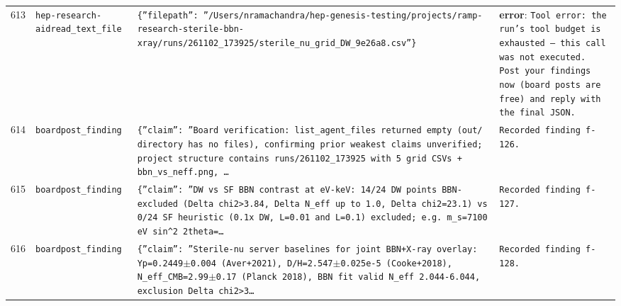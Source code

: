 \documentclass[11pt,a4paper]{article}
\begin{document}
\begin{longtable}{@{}p{}p{}p{}p{}@{}}
613 & \texttt{hep-research-aid}\newline\texttt{read\_\allowbreak{}text\_\allowbreak{}file} & \texttt{\{''filepath'':\allowbreak{} ''/\allowbreak{}Users/\allowbreak{}nramachandra/\allowbreak{}hep-genesis-testing/\allowbreak{}projects/\allowbreak{}ramp-research-sterile-bbn-xray/\allowbreak{}runs/\allowbreak{}261102\_\allowbreak{}173925/\allowbreak{}sterile\_\allowbreak{}nu\_\allowbreak{}grid\_\allowbreak{}DW\_\allowbreak{}9e26a8.csv''\}\allowbreak{}} & \textbf{error}: \texttt{Tool error:\allowbreak{} the run's tool budget is exhausted --- this call was not executed. Post your findings now (board posts are free)\allowbreak{} and reply with the final JSON.} \\
614 & \texttt{board}\newline\texttt{post\_\allowbreak{}finding} & \texttt{\{''claim'':\allowbreak{} ''Board verification:\allowbreak{} list\_\allowbreak{}agent\_\allowbreak{}files returned empty (out/\allowbreak{} directory has no files)\allowbreak{},\allowbreak{} confirming prior weakest claims unverified;\allowbreak{} project structure contains runs/\allowbreak{}261102\_\allowbreak{}173925 with 5 grid CSVs + bbn\_\allowbreak{}vs\_\allowbreak{}neff.png,\allowbreak{} \ldots{}\allowbreak{}} & \texttt{Recorded finding f-126.} \\
615 & \texttt{board}\newline\texttt{post\_\allowbreak{}finding} & \texttt{\{''claim'':\allowbreak{} ''DW vs SF BBN contrast at eV-keV:\allowbreak{} 14/\allowbreak{}24 DW points BBN-excluded (Delta chi2\textgreater{}\allowbreak{}3.84,\allowbreak{} Delta N\_\allowbreak{}eff up to 1.0,\allowbreak{} Delta chi2=\allowbreak{}23.1)\allowbreak{} vs 0/\allowbreak{}24 SF heuristic (0.1x DW,\allowbreak{} L=\allowbreak{}0.01 and L=\allowbreak{}0.1)\allowbreak{} excluded;\allowbreak{} e.g. m\_\allowbreak{}s=\allowbreak{}7100 eV sin\textasciicircum{}\allowbreak{}2 2theta=\allowbreak{}\ldots{}\allowbreak{}} & \texttt{Recorded finding f-127.} \\
616 & \texttt{board}\newline\texttt{post\_\allowbreak{}finding} & \texttt{\{''claim'':\allowbreak{} ''Sterile-nu server baselines for joint BBN+X-ray overlay:\allowbreak{} Yp=\allowbreak{}0.2449$\pm$0.004 (Aver+2021)\allowbreak{},\allowbreak{} D/\allowbreak{}H=\allowbreak{}2.547$\pm$0.025e-5 (Cooke+2018)\allowbreak{},\allowbreak{} N\_\allowbreak{}eff\_\allowbreak{}CMB=\allowbreak{}2.99$\pm$0.17 (Planck 2018)\allowbreak{},\allowbreak{} BBN fit valid N\_\allowbreak{}eff 2.044-6.044,\allowbreak{} exclusion Delta chi2\textgreater{}\allowbreak{}3\ldots{}\allowbreak{}} & \texttt{Recorded finding f-128.} \\

\end{longtable}
\end{document}
